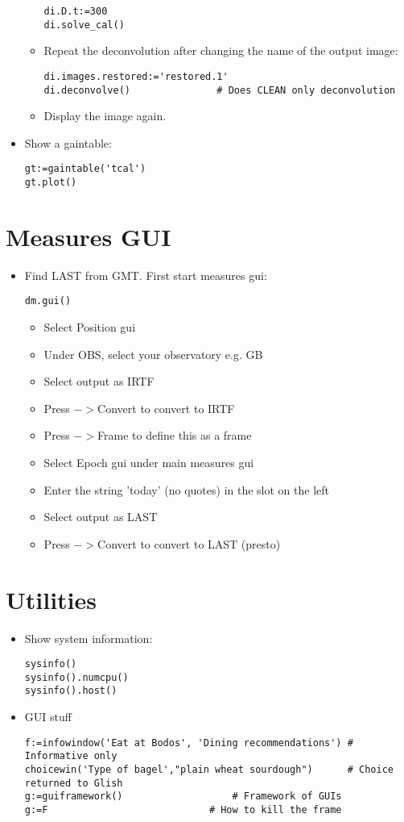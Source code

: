\begin{itemize}
\begin{itemize}
\begin{verbatim}
di.D.t:=300
di.solve_cal()
\end{verbatim}
\item Repeat the deconvolution after changing the name of the output
image: 
\begin{verbatim}
di.images.restored:='restored.1'
di.deconvolve()               # Does CLEAN only deconvolution
\end{verbatim}
\item Display the image again.
\end{itemize}
\item Show a gaintable:
\begin{verbatim}
gt:=gaintable('tcal')
gt.plot()
\end{verbatim}
\end{itemize}

\section{Measures GUI}

\begin{itemize}
\item Find LAST from GMT. First start measures gui:
\begin{verbatim}
dm.gui()
\end{verbatim}
\begin{itemize}
\item Select Position gui
\item Under OBS, select your observatory e.g. GB
\item Select output as IRTF
\item Press $->$Convert to convert to IRTF
\item Press $->$Frame to define this as a frame
\item Select Epoch gui under main measures gui
\item Enter the string 'today' (no quotes) in the slot on
the left
\item Select output as LAST
\item Press $->$Convert to convert to LAST (presto)
\end{itemize}
\end{itemize}

\section{Utilities}

\begin{itemize}
\item Show system information:
\begin{verbatim}
sysinfo()
sysinfo().numcpu()
sysinfo().host()
\end{verbatim}
\item GUI stuff
\begin{verbatim}
f:=infowindow('Eat at Bodos', 'Dining recommendations') # Informative only
choicewin('Type of bagel',"plain wheat sourdough")      # Choice returned to Glish
g:=guiframework()					# Framework of GUIs
g:=F							# How to kill the frame
\end{verbatim}
\end{itemize}

